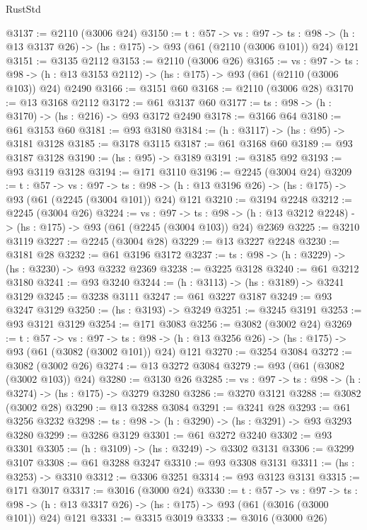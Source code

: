 \begin{lexlean}{RustStd}
\begin{coremodule}
{\begin{coremodule}
{{{{{{{{{{{{{@3137 := @2110 (@3006 @24)
@3150 := {t : @57} ->
  {vs : @97} ->
  {ts : @98} -> (h : @13 @3137 @26) -> (hs : @175) -> @93 (@61 (@2110 (@3006 @101)) @24) @121
@3151 := @3135 @2112
@3153 := @2110 (@3006 @26)
@3165 := {vs : @97} ->
  {ts : @98} -> (h : @13 @3153 @2112) -> (hs : @175) -> @93 (@61 (@2110 (@3006 @103)) @24) @2490
@3166 := @3151 @60
@3168 := @2110 (@3006 @28)
@3170 := @13 @3168 @2112
@3172 := @61 @3137 @60
@3177 := {ts : @98} -> (h : @3170) -> (hs : @216) -> @93 @3172 @2490
@3178 := @3166 @64
@3180 := @61 @3153 @60
@3181 := @93 @3180
@3184 := (h : @3117) -> (hs : @95) -> @3181 @3128
@3185 := @3178 @3115
@3187 := @61 @3168 @60
@3189 := @93 @3187 @3128
@3190 := (hs : @95) -> @3189
@3191 := @3185 @92
@3193 := @93 @3119 @3128
@3194 := @171 @3110
@3196 := @2245 (@3004 @24)
@3209 := {t : @57} ->
  {vs : @97} ->
  {ts : @98} -> (h : @13 @3196 @26) -> (hs : @175) -> @93 (@61 (@2245 (@3004 @101)) @24) @121
@3210 := @3194 @2248
@3212 := @2245 (@3004 @26)
@3224 := {vs : @97} ->
  {ts : @98} -> (h : @13 @3212 @2248) -> (hs : @175) -> @93 (@61 (@2245 (@3004 @103)) @24) @2369
@3225 := @3210 @3119
@3227 := @2245 (@3004 @28)
@3229 := @13 @3227 @2248
@3230 := @3181 @28
@3232 := @61 @3196 @3172
@3237 := {ts : @98} -> (h : @3229) -> (hs : @3230) -> @93 @3232 @2369
@3238 := @3225 @3128
@3240 := @61 @3212 @3180
@3241 := @93 @3240
@3244 := (h : @3113) -> (hs : @3189) -> @3241 @3129
@3245 := @3238 @3111
@3247 := @61 @3227 @3187
@3249 := @93 @3247 @3129
@3250 := (hs : @3193) -> @3249
@3251 := @3245 @3191
@3253 := @93 @3121 @3129
@3254 := @171 @3083
@3256 := @3082 (@3002 @24)
@3269 := {t : @57} ->
  {vs : @97} ->
  {ts : @98} -> (h : @13 @3256 @26) -> (hs : @175) -> @93 (@61 (@3082 (@3002 @101)) @24) @121
@3270 := @3254 @3084
@3272 := @3082 (@3002 @26)
@3274 := @13 @3272 @3084
@3279 := @93 (@61 (@3082 (@3002 @103)) @24)
@3280 := @3130 @26
@3285 := {vs : @97} -> {ts : @98} -> (h : @3274) -> (hs : @175) -> @3279 @3280
@3286 := @3270 @3121
@3288 := @3082 (@3002 @28)
@3290 := @13 @3288 @3084
@3291 := @3241 @28
@3293 := @61 @3256 @3232
@3298 := {ts : @98} -> (h : @3290) -> (hs : @3291) -> @93 @3293 @3280
@3299 := @3286 @3129
@3301 := @61 @3272 @3240
@3302 := @93 @3301
@3305 := (h : @3109) -> (hs : @3249) -> @3302 @3131
@3306 := @3299 @3107
@3308 := @61 @3288 @3247
@3310 := @93 @3308 @3131
@3311 := (hs : @3253) -> @3310
@3312 := @3306 @3251
@3314 := @93 @3123 @3131
@3315 := @171 @3017
@3317 := @3016 (@3000 @24)
@3330 := {t : @57} ->
  {vs : @97} ->
  {ts : @98} -> (h : @13 @3317 @26) -> (hs : @175) -> @93 (@61 (@3016 (@3000 @101)) @24) @121
@3331 := @3315 @3019
@3333 := @3016 (@3000 @26)
}}}}}}}}}}}}}
\end{coremodule}}
\end{coremodule}
\end{lexlean}
